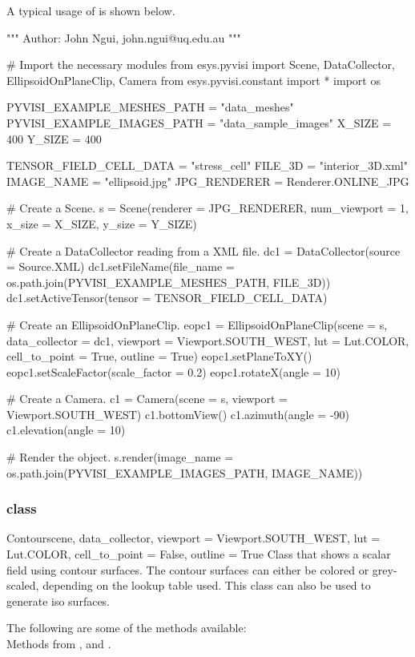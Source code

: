 A typical usage of \EllipsoidOnPlaneClip is shown below.

\begin{python}
"""
Author: John Ngui, john.ngui@uq.edu.au
"""

# Import the necessary modules
from esys.pyvisi import Scene, DataCollector, EllipsoidOnPlaneClip, Camera
from esys.pyvisi.constant import *
import os

PYVISI_EXAMPLE_MESHES_PATH = "data_meshes"
PYVISI_EXAMPLE_IMAGES_PATH = "data_sample_images"
X_SIZE = 400
Y_SIZE = 400

TENSOR_FIELD_CELL_DATA = "stress_cell"
FILE_3D = "interior_3D.xml"
IMAGE_NAME = "ellipsoid.jpg"
JPG_RENDERER = Renderer.ONLINE_JPG

# Create a Scene.
s = Scene(renderer = JPG_RENDERER, num_viewport = 1, x_size = X_SIZE, 
        y_size = Y_SIZE)

# Create a DataCollector reading from a XML file.
dc1 = DataCollector(source = Source.XML)
dc1.setFileName(file_name = os.path.join(PYVISI_EXAMPLE_MESHES_PATH, FILE_3D))
dc1.setActiveTensor(tensor = TENSOR_FIELD_CELL_DATA)

# Create an EllipsoidOnPlaneClip.
eopc1 = EllipsoidOnPlaneClip(scene = s, data_collector = dc1, 
        viewport = Viewport.SOUTH_WEST, lut = Lut.COLOR, cell_to_point = True, 
        outline = True)
eopc1.setPlaneToXY()
eopc1.setScaleFactor(scale_factor = 0.2)
eopc1.rotateX(angle = 10)

# Create a Camera.
c1 = Camera(scene = s, viewport = Viewport.SOUTH_WEST)
c1.bottomView()
c1.azimuth(angle = -90)
c1.elevation(angle = 10)

# Render the object.
s.render(image_name = os.path.join(PYVISI_EXAMPLE_IMAGES_PATH, IMAGE_NAME))
\end{python}

\subsubsection{\Contour class}

\begin{classdesc}{Contour}{scene, data_collector, 
viewport = Viewport.SOUTH_WEST, lut = Lut.COLOR, cell_to_point = False, 
outline = True}
Class that shows a scalar field using contour surfaces. The contour surfaces can
either be colored or grey-scaled, depending on the lookup table used. This
class can also be used to generate iso surfaces.
\end{classdesc}

The following are some of the methods available:\\
Methods from \ActorThreeD, \ContourModule and \DataSetMapper. 


